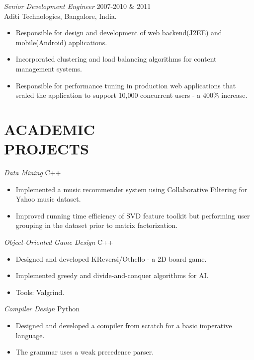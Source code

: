 \documentclass[line,margin]{res}
\begin{document}
\begin{resume}
\begin{itemize}
		\end{itemize} 
		{\sl Senior Development Engineer} \hfill        2007-2010 \& 2011 \\
		Aditi Technologies, Bangalore, India.
		\begin{itemize}
			\item Responsible for design and development of web backend(J2EE) and mobile(Android) applications.
			\item Incorporated clustering and load balancing algorithms for content management systems.
			\item Responsible for performance tuning in production web applications that scaled the application to support 10,000 concurrent users - a 400\% increase.
		\end{itemize} 
		
		
		\section{ACADEMIC \\ PROJECTS}  {\sl Data Mining} \hfill        C++
		\begin{itemize}  \itemsep -2pt %
			\item Implemented a music recommender system using Collaborative Filtering for Yahoo music dataset.
			\item Improved running time efficiency of SVD feature toolkit but performing user grouping in the dataset prior to matrix factorization.
		\end{itemize} 
		{\sl Object-Oriented Game Design}  \hfill        C++
		\begin{itemize} \itemsep -2pt
			\item Designed and developed KReversi/Othello - a 2D board game.
			\item Implemented greedy and divide-and-conquer algorithms for AI.
			\item Tools: Valgrind.
		\end{itemize} 
		{\sl Compiler Design}  \hfill        Python
		\begin{itemize} \itemsep -2pt
			\item Designed and developed a compiler from scratch for a basic imperative language.
			\item The grammar uses a weak precedence parser.       
		\end{itemize}
		

\end{resume}
\end{document}
